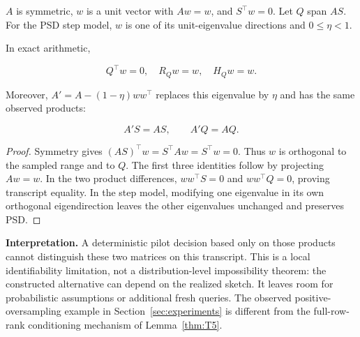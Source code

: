 \begin{proposition}\label{thm:T6}
$A$ is symmetric, $w$ is a unit vector with $Aw=w$, and $S^\top w=0$. Let $Q$ span $AS$. For the PSD step model, $w$ is one of its unit-eigenvalue directions and $0\le\eta<1$.


In exact arithmetic,


\begin{equation}
Q^\top w=0,\quad R_Qw=w,\quad H_Qw=w.
\end{equation}


Moreover, $A'=A-(1-\eta)ww^\top$ replaces this eigenvalue by $\eta$ and has the same observed products:


\begin{equation}
A'S=AS,\qquad A'Q=AQ.
\end{equation}


\end{proposition}
\begin{proof}
Symmetry gives $(AS)^\top w=S^\top Aw=S^\top w=0$. Thus $w$ is orthogonal to the sampled range and to $Q$. The first three identities follow by projecting $Aw=w$. In the two product differences, $ww^\top S=0$ and $ww^\top Q=0$, proving transcript equality. In the step model, modifying one eigenvalue in its own orthogonal eigendirection leaves the other eigenvalues unchanged and preserves PSD.

\end{proof}


\textbf{Interpretation.} A deterministic pilot decision based only on those products cannot distinguish these two matrices on this transcript. This is a local identifiability limitation, not a distribution-level impossibility theorem: the constructed alternative can depend on the realized sketch. It leaves room for probabilistic assumptions or additional fresh queries. The observed positive-oversampling example in Section~\ref{sec:experiments} is different from the full-row-rank conditioning mechanism of Lemma~\ref{thm:T5}.

